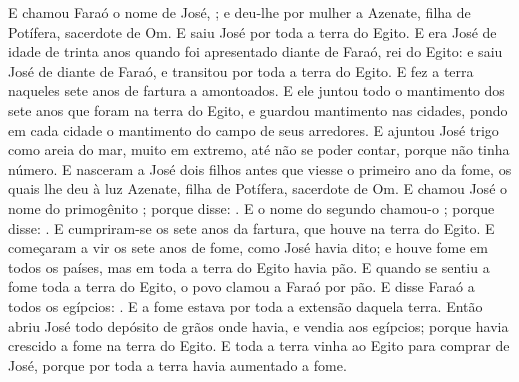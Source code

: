 {{  E chamou Faraó o nome de José, ; e deu-lhe por mulher a Azenate, filha de Potífera, sacerdote de Om. E saiu José por toda a terra do Egito.
  E era José de idade de trinta anos quando foi apresentado diante de Faraó, rei do Egito: e saiu José de diante de Faraó, e transitou por toda a terra do Egito.
  E fez a terra naqueles sete anos de fartura a amontoados.
  E ele juntou todo o mantimento dos sete anos que foram na terra do Egito, e guardou mantimento nas cidades, pondo em cada cidade o mantimento do campo de seus arredores.
  E ajuntou José trigo como areia do mar, muito em extremo, até não se poder contar, porque não tinha número.
  E nasceram a José dois filhos antes que viesse o primeiro ano da fome, os quais lhe deu à luz Azenate, filha de Potífera, sacerdote de Om.
  E chamou José o nome do primogênito ; porque disse: .
  E o nome do segundo chamou-o ; porque disse: .
  E cumpriram-se os sete anos da fartura, que houve na terra do Egito.
  E começaram a vir os sete anos de fome, como José havia dito; e houve fome em todos os países, mas em toda a terra do Egito havia pão.
  E quando se sentiu a fome toda a terra do Egito, o povo clamou a Faraó por pão. E disse Faraó a todos os egípcios: .
  E a fome estava por toda a extensão daquela terra. Então abriu José todo depósito de grãos onde havia, e vendia aos egípcios; porque havia crescido a fome na terra do Egito.
  E toda a terra vinha ao Egito para comprar de José, porque por toda a terra havia aumentado a fome.
\par }

}
